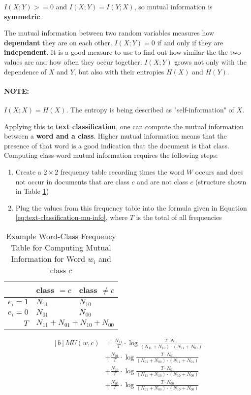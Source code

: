 \documentclass{article}
\begin{document}
$I(X;Y) >= 0$ and $I(X;Y) = I(Y;X)$, so mutual information is \textbf{symmetric}.

The mutual information between two random variables measures how \textbf{dependant} they are on each other. $I(X;Y) = 0$ if and only if they are \textbf{independent}. It is a good measure to use to find out how similar the the two values are and how often they occur together. $I(X;Y)$ grows not only with the dependence of $X$ and $Y$, but also with their entropies $H(X)$ and $H(Y)$.

\paragraph{\textbf{NOTE: }} $I(X;X)= H(X)$. The entropy is being described as "self-information" of $X$.

Applying this to \textbf{text classification}, one can compute the mutual information between a \textbf{word and a class}. Higher mutual information means that the presence of that word is a good indication that the document is that class. Computing class-word mutual information requires the following steps:
\begin{enumerate}
	\item Create a $2 \times 2$ frequency table recording times the word $W$ occurs and does not occur in documents that are class $c$ and are not class $c$ (structure shown in Table \ref{tab:mu-freq-table})
	\item Plug the values from this frequency table into the formula given in Equation \ref{eq:text-classification-mu-info}, where $T$ is the total of all frequencies
\end{enumerate}

\begin{table}[H]
	\centering
	\begin{tabular}{|r|l|l|}
		\hline
		& class $=c$ & class $\neq c$ \\
		\hline
		$e_i = 1$ & $N_{11}$ & $N_{10}$ \\
		$e_i = 0$ & $N_{01}$ & $N_{00}$ \\
		\hline
		$T$ & \multicolumn{2}{l|}{$N_{11} + N_{01} + N_{10} + N_{00}$}  \\
		\hline
	\end{tabular}
	\caption{Example Word-Class Frequency Table for Computing Mutual Information for Word $w_i$ and class $c$}
	\label{tab:mu-freq-table}
\end{table}

\begin{equation}
\begin{aligned}[b]
	MU(w, c) &= \frac{N_{11}}{T} \cdot \log \frac{T \cdot N_{11} }{(N_{11} + N_{10}) \cdot (N_{11} + N_{01})} \\
	&+ \frac{N_{01}}{T} \cdot \log \frac{T \cdot N_{01} }{(N_{01} + N_{00}) \cdot (N_{11} + N_{01})} \\
	&+ \frac{N_{10}}{T} \cdot \log \frac{T \cdot N_{01} }{(N_{11} + N_{10}) \cdot (N_{10} + N_{00})} \\
	&+ \frac{N_{00}}{T} \cdot \log \frac{T \cdot N_{00} }{(N_{01} + N_{00}) \cdot (N_{10} + N_{00})}
	\label{eq:text-classification-mu-info}
\end{aligned}
\end{equation}
\end{document}
